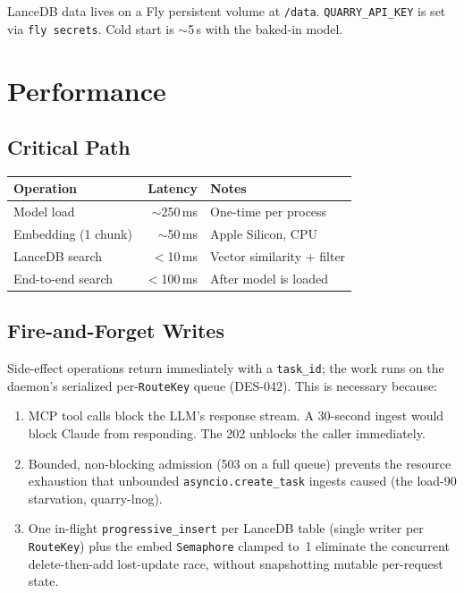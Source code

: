\documentclass[a4paper,10pt]{article}
\newcommand{\field}[1]{\texttt{#1}}
\begin{document}
LanceDB data lives on a Fly persistent volume at \texttt{/data}.
\texttt{QUARRY\_API\_KEY} is set via \texttt{fly secrets}.
Cold start is $\sim$5\,s with the baked-in model.

\section{Performance}

\subsection{Critical Path}

\begin{center}
\begin{tabular}{lrl}
\toprule
\textbf{Operation} & \textbf{Latency} & \textbf{Notes} \\
\midrule
Model load         & $\sim$250\,ms & One-time per process \\
Embedding (1 chunk) & $\sim$50\,ms  & Apple Silicon, CPU \\
LanceDB search     & $<$10\,ms     & Vector similarity + filter \\
End-to-end search  & $<$100\,ms    & After model is loaded \\
\bottomrule
\end{tabular}
\end{center}

\subsection{Fire-and-Forget Writes}

Side-effect operations return immediately with a \field{task\_id}; the
work runs on the daemon's serialized per-\texttt{RouteKey} queue
(DES-042).  This is necessary because:

\begin{enumerate}
  \item MCP tool calls block the LLM's response stream.  A 30-second
    ingest would block Claude from responding.  The 202 unblocks the
    caller immediately.
  \item Bounded, non-blocking admission (503 on a full queue) prevents
    the resource exhaustion that unbounded \texttt{asyncio.create\_task}
    ingests caused (the load-90 starvation, quarry-lnog).
  \item One in-flight \texttt{progressive\_insert} per LanceDB table
    (single writer per \texttt{RouteKey}) plus the embed
    \texttt{Semaphore} clamped to~1 eliminate the concurrent
    delete-then-add lost-update race, without snapshotting mutable
    per-request state.
\end{enumerate}
\end{document}

